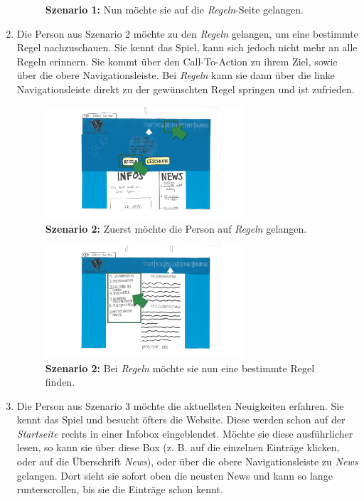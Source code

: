 \documentclass{scrartcl}
\begin{document}
\begin{enumerate}
\begin{figure}[H]
\begin{center}
\caption{\textbf{Szenario 1:} Nun möchte sie auf die \textit{Regeln}-Seite gelangen.}
 \end{center}
\end{figure}  
\item Die Person aus Szenario 2 möchte zu den \textit{Regeln} gelangen, um eine bestimmte Regel nachzuschauen. Sie kennt das Spiel, kann sich jedoch nicht mehr an alle Regeln erinnern. Sie kommt über den Call-To-Action zu ihrem Ziel, sowie über die obere Navigationsleiste. Bei \textit{Regeln} kann sie dann über die linke Navigationsleiste direkt zu der gewünschten Regel springen und ist zufrieden.
\begin{figure}[H]
 \begin{center}
 \includegraphics[width=0.7\textwidth]{szenario2-1.jpg}
\caption{\textbf{Szenario 2:} Zuerst möchte die Person auf \textit{Regeln} gelangen.}
 \end{center}
\end{figure}  
\begin{figure}[H]
 \begin{center}
 \includegraphics[width=0.7\textwidth]{szenario2-2.jpg}
\caption{\textbf{Szenario 2:} Bei \textit{Regeln} möchte sie nun eine bestimmte Regel finden.}
 \end{center}
\end{figure}  
\item Die Person aus Szenario 3 möchte die aktuellsten Neuigkeiten erfahren. Sie kennt das Spiel und besucht öfters die Website. Diese werden schon auf der \textit{Startseite} rechts in einer Infobox eingeblendet. Möchte sie diese ausführlicher lesen, so kann sie über diese Box (z. B. auf die einzelnen Einträge klicken, oder auf die Überschrift \textit{News}), oder über die obere Navigationsleiste zu \textit{News} gelangen. Dort sieht sie sofort oben die neusten News und kann so lange runterscrollen, bis sie die Einträge schon kennt.

\end{enumerate}
\end{document}
